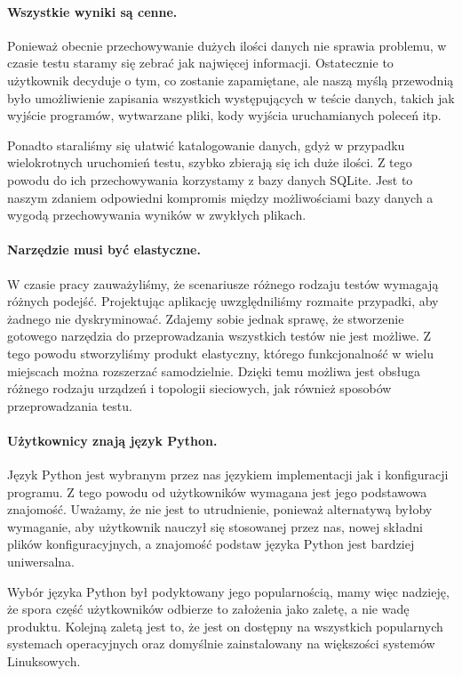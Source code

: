 \documentclass[00-praca-magisterska.tex]{subfiles}
\begin{document}

\paragraph{Wszystkie wyniki są cenne.} Ponieważ obecnie przechowywanie dużych
ilości danych nie sprawia problemu, w czasie testu staramy się zebrać jak
najwięcej informacji. Ostatecznie to użytkownik decyduje o tym, co zostanie
zapamiętane, ale naszą myślą przewodnią było umożliwienie zapisania wszystkich
występujących w teście danych, takich jak wyjście programów, wytwarzane pliki,
kody wyjścia uruchamianych poleceń itp.

Ponadto staraliśmy się ułatwić katalogowanie danych, gdyż w przypadku
wielokrotnych uruchomień testu, szybko zbierają się ich duże ilości. Z tego
powodu do ich przechowywania korzystamy z bazy danych SQLite. Jest to naszym
zdaniem odpowiedni kompromis między możliwościami bazy danych a wygodą
przechowywania wyników w zwykłych plikach.

\paragraph{Narzędzie musi być elastyczne.} W czasie pracy zauważyliśmy, że
scenariusze różnego rodzaju testów wymagają różnych podejść. Projektując
aplikację uwzględniliśmy rozmaite przypadki, aby żadnego nie dyskryminować.
Zdajemy sobie jednak sprawę, że stworzenie gotowego narzędzia do przeprowadzania
wszystkich testów nie jest możliwe. Z tego powodu stworzyliśmy produkt
elastyczny, którego funkcjonalność w wielu miejscach można rozszerzać
samodzielnie. Dzięki temu możliwa jest obsługa różnego rodzaju urządzeń i
topologii sieciowych, jak również sposobów przeprowadzania testu.

\paragraph{Użytkownicy znają język Python.} Język Python jest wybranym przez nas
językiem implementacji jak i konfiguracji programu. Z tego powodu od
użytkowników wymagana jest jego podstawowa znajomość. Uważamy, że nie jest to
utrudnienie, ponieważ alternatywą byłoby wymaganie, aby użytkownik nauczył się
stosowanej przez nas, nowej składni plików konfiguracyjnych, a znajomość podstaw
języka Python jest bardziej uniwersalna.

Wybór języka Python był podyktowany jego popularnością, mamy więc nadzieję, że
spora część użytkowników odbierze to założenia jako zaletę, a nie wadę
produktu. Kolejną zaletą jest to, że jest on dostępny na wszystkich popularnych
systemach operacyjnych oraz domyślnie zainstalowany na większości systemów
Linuksowych.
\end{document}
